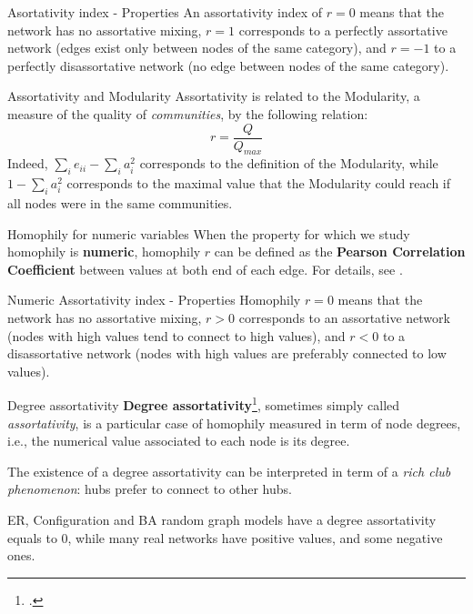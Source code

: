\begin{textbox}{Asortativity index - Properties}
    An assortativity index of $r=0$ means that the network has no assortative mixing, $r=1$ corresponds to a perfectly assortative network (edges exist only between nodes of the same category), and $r=-1$ to a perfectly disassortative network (no edge between nodes of the same category).
\end{textbox}


\begin{textbox}{Assortativity and Modularity}
    Assortativity is related to the Modularity, a measure of the quality of \textit{communities}, by the following relation:
    \[
        r=\frac{Q}{Q_{max}}
    \]
    Indeed, $\sum_i e_{ii} - \sum_i a_i^2$ corresponds to the definition of the Modularity, while $1- \sum_i a_i^2$ corresponds to the maximal value that the Modularity could reach if all nodes were in the same communities.
\end{textbox}


\begin{textbox}{Homophily for numeric variables}
    When the property for which we study homophily is \textbf{numeric}, homophily $r$ can be defined as the \textbf{Pearson Correlation Coefficient} between values at both end of each edge. For details, see \cite{newman2003mixing}.
\end{textbox}


\begin{textbox}{Numeric Assortativity index - Properties}
    Homophily $r=0$ means that the network has no assortative mixing, $r>0$ corresponds to an assortative network (nodes with high values tend to connect to high values), and $r<0$ to a disassortative network (nodes with high values are preferably connected to low values).
\end{textbox}


\begin{textbox}{Degree assortativity}
    \textbf{Degree assortativity}\footcite{newman2003mixing}, sometimes simply called \textit{assortativity}, is a particular case of homophily measured  in term of node degrees, i.e., the numerical value associated to each node is its degree.

    The existence of a degree assortativity can be interpreted in term of a \textit{rich club phenomenon}: hubs prefer to connect to other hubs.

    ER, Configuration and BA random graph models have a degree assortativity equals to 0, while many real networks have positive values, and some negative ones.
\end{textbox}


